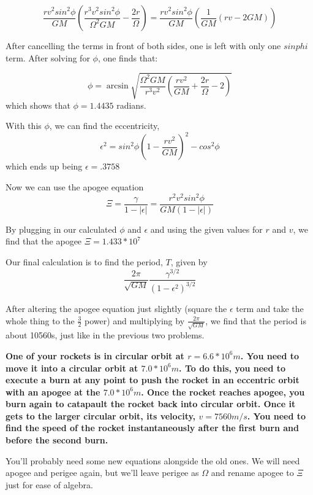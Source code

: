 \documentclass{article}
\begin{document}
$$\frac{rv^2sin^2{\phi}}{GM}(\frac{r^3v^2sin^2{\phi}}{\Omega^2GM} - \frac{2r}{\Omega}) = \frac{rv^2sin^2{\phi}}{GM}(\frac{1}{GM}(rv - 2GM))$$

After cancelling the terms in front of both sides, one is left with only one $sin{phi}$ term.  After solving for $\phi$, one finds that:

$$ \phi = \arcsin{\sqrt{\frac{\Omega^2GM}{r^3v^2}(\frac{rv^2}{GM} + \frac{2r}{\Omega} - 2)}}$$  which shows that $\phi = 1.4435$ radians.

\smallskip

With this $\phi$, we can find the eccentricity, $$\epsilon^2 = sin^2{\phi}(1 - \frac{rv^2}{GM})^2 - cos^2{\phi}$$ which ends up being $\epsilon = .3758$

\smallskip

Now we can use the apogee equation $$\Xi = \frac{\gamma}{1 - |\epsilon|} = \frac{r^2v^2sin^2{\phi}}{GM(1 - |\epsilon|)}$$ 

By plugging in our calculated $\phi$ and $\epsilon$ and using the given values for $r$ and $v$, we find that the apogee $\Xi = 1.433*10^7$

\smallskip

Our final calculation is to find the period, $T$, given by $$\frac{2\pi}{\sqrt{GM}}\frac{\gamma^{3/2}}{(1 - \epsilon^2)^{3/2}}$$

After altering the apogee equation just slightly (square the $\epsilon$ term and take the whole thing to the $\frac{3}{2}$ power) and multiplying by $\frac{2\pi}{\sqrt{GM}}$, we find that the period is about 10560s, just like in the previous two problems.

\bigskip
\bigskip

\textbf{One of your rockets is in circular orbit at $r = 6.6*10^6m$.  You need to move it into a circular orbit at $7.0*10^6m$.  To do this, you need to execute a burn at any point to push the rocket in an eccentric orbit with an apogee at the $7.0*10^6m$.  Once the rocket reaches apogee, you burn again to catapault the rocket back into circular orbit.  Once it gets to the larger circular orbit, its velocity, $v = 7560m/s$.  You need to find the speed of the rocket instantaneously after the first burn and before the second burn.}

\bigskip

You'll probably need some new equations alongside the old ones.  We will need apogee and perigee again, but we'll leave perigee as $\Omega$ and rename apogee to $\Xi$ just for ease of algebra.
\end{document}
